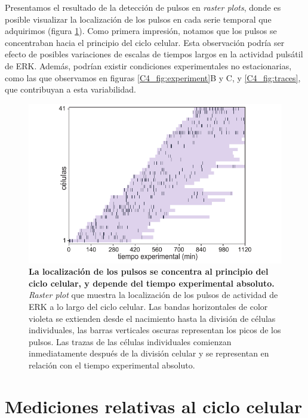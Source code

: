 \documentclass[./main.tex]{subfiles}
\begin{document}
Presentamos el resultado de la detección de pulsos en \textit{raster plots}, donde es posible visualizar la localización de los pulsos en cada serie temporal que adquirimos (figura \ref{C4_fig:raster_plot}). Como primera impresión, notamos que los pulsos se concentraban hacia el principio del ciclo celular. Esta observación podría ser efecto de posibles variaciones de escalas de tiempos largos en la actividad pulsátil de ERK. Además, podrían existir condiciones experimentales no estacionarias, como las que observamos en figuras \ref{C4_fig:experiment}B y C, y \ref{C4_fig:traces}, que contribuyan a esta variabilidad.


\begin{figure}
    \centering
    \includegraphics[width=1\columnwidth]{figures/chapter4/C4_raster_plot.pdf}\caption{\textbf{La localización de los pulsos se concentra al principio del ciclo celular, y depende del tiempo experimental absoluto.} \textit{Raster plot} que muestra la localización de los pulsos de actividad de ERK a lo largo del ciclo celular. Las bandas horizontales de color violeta se extienden desde el nacimiento hasta la división de células individuales, las barras verticales oscuras representan los picos de los pulsos. Las trazas de las células individuales comienzan inmediatamente después de la división celular y se representan en relación con el tiempo experimental absoluto. }
    \label{C4_fig:raster_plot}
\end{figure}

\section{Mediciones relativas al ciclo celular}
\label{C4_sec:analisis}
\end{document}
